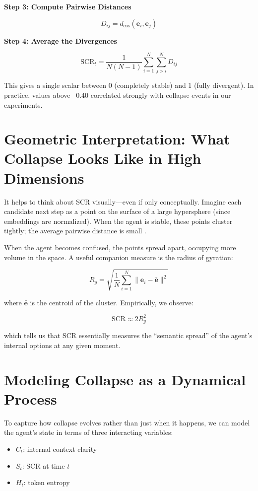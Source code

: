 \documentclass[12pt,a4paper]{report}
\begin{document}
\textbf{Step 3: Compute Pairwise Distances}

\begin{equation}
D_{ij} = d_{\cos}(\mathbf{e}_i, \mathbf{e}_j)
\end{equation}

\textbf{Step 4: Average the Divergences}

\begin{equation}
\text{SCR}_t = \frac{1}{N(N-1)} \sum_{i=1}^{N} \sum_{j>i}^{N} D_{ij}
\end{equation}

This gives a single scalar between 0 (completely stable) and 1 (fully divergent). In practice, values above ~0.40 correlated strongly with collapse events in our experiments.

\section{Geometric Interpretation: What Collapse Looks Like in High Dimensions}
It helps to think about SCR visually—even if only conceptually. Imagine each candidate next step as a point on the surface of a large hypersphere (since embeddings are normalized). When the agent is stable, these points cluster tightly; the average pairwise distance is small \cite{Blei2019Model}.

When the agent becomes confused, the points spread apart, occupying more volume in the space. A useful companion measure is the radius of gyration:

\begin{equation}
R_g = \sqrt{ \frac{1}{N} \sum_{i=1}^{N} \lVert \mathbf{e}_i - \bar{\mathbf{e}} \rVert^2 }
\end{equation}

where $\bar{\mathbf{e}}$ is the centroid of the cluster. Empirically, we observe:

\begin{equation}
\text{SCR} \approx 2R_g^2
\end{equation}

which tells us that SCR essentially measures the “semantic spread” of the agent’s internal options at any given moment.

\section{Modeling Collapse as a Dynamical Process}
To capture how collapse evolves rather than just when it happens, we can model the agent’s state in terms of three interacting variables:
\begin{itemize}
    \item $C_t$: internal context clarity
    \item $S_t$: SCR at time $t$
    \item $H_t$: token entropy
\end{itemize}
\end{document}
